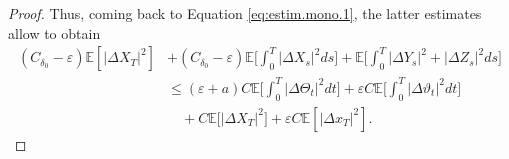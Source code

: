 \documentclass[11pt,reqno]{amsart}
\numberwithin{equation}{section}
\theoremstyle{definition}
\def\E{{\mathbb E}}
\def \E{\mathbb{E}}
\def \e{\mathrm{e}}
\begin{document}
\begin{proof}
  Thus, coming back to Equation \ref{eq:estim.mono.1}, the latter estimates allow to obtain
  \begin{align*}
    (C_{\delta_0} - \varepsilon)\E[|\Delta X_T|^2] & + (C_{\delta_0} - \varepsilon)\E\bigg[\int_0^T|\Delta X_s|^2ds\bigg] + \E\bigg[\int_0^T|\Delta Y_s|^2 + |\Delta Z_s|^2ds \bigg]\\
    &\le (\varepsilon + a)C\E\bigg[\int_0^T|\Delta \Theta_t|^2dt \bigg] + \varepsilon C\E\bigg[\int_0^T|\Delta\vartheta_t|^2dt\bigg]\\
    &\quad+ C \E\big[|\Delta X_T|^2\big]+ \varepsilon C\E[|\Delta x_T|^2].
  \end{align*}

\end{proof}
\end{document}
